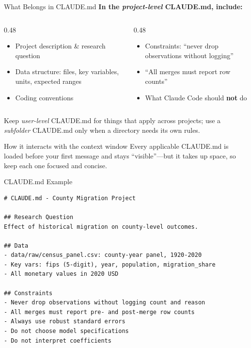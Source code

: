 \documentclass[aspectratio=169, 11pt]{beamer}
\begin{document}
\begin{frame}{What Belongs in CLAUDE.md}
  \textbf{In the \textit{project-level} CLAUDE.md, include:}
  \begin{columns}[T]
    \begin{column}{0.48\textwidth}
      \begin{itemize}
        \item Project description \& research question
        \item Data structure: files, key variables, units, expected ranges
        \item Coding conventions
      \end{itemize}
    \end{column}
    \begin{column}{0.48\textwidth}
      \begin{itemize}
        \item Constraints: ``never drop observations without logging''
        \item ``All merges must report row counts''
        \item What Claude Code should \textbf{not} do
      \end{itemize}
    \end{column}
  \end{columns}

  \vspace{0.4em}
  {\footnotesize Keep \textit{user-level} CLAUDE.md for things that apply across projects; use a \textit{subfolder} CLAUDE.md only when a directory needs its own rules.}

  \vspace{0.4em}
  \begin{block}{How it interacts with the context window}
    Every applicable CLAUDE.md is loaded before your first message and stays ``visible''---but it takes up space, so keep each one focused and concise.
  \end{block}
\end{frame}

\begin{frame}[fragile]{CLAUDE.md Example}
\begin{lstlisting}
# CLAUDE.md - County Migration Project

## Research Question
Effect of historical migration on county-level outcomes.

## Data
- data/raw/census_panel.csv: county-year panel, 1920-2020
- Key vars: fips (5-digit), year, population, migration_share
- All monetary values in 2020 USD

## Constraints
- Never drop observations without logging count and reason
- All merges must report pre- and post-merge row counts
- Always use robust standard errors
- Do not choose model specifications
- Do not interpret coefficients
\end{lstlisting}
\end{frame}
\end{document}
